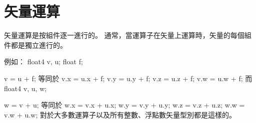 \section{矢量運算}

矢量運算是按組件逐一進行的。
通常，當運算子在矢量上運算時，矢量的每個組件都是獨立進行的。

例如：
\startclc
float4	v, u;
float	f;

v = u + f;
\stopclc
等同於
\startclc
v.x = u.x + f;
v.y = u.y + f;
v.z = u.z + f;
v.w = u.w + f;
\stopclc
而
\startclc
float4	v, u, w;

w = v + u;
\stopclc
等同於
\startclc
w.x = v.x + u.x;
w.y = v.y + u.y;
w.z = v.z + u.z;
w.w = v.w + u.w;
\stopclc
對於大多數運算子以及所有整數、浮點數矢量型別都是這樣的。
